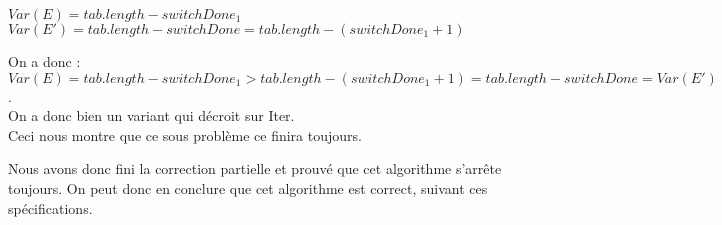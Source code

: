 $Var(E) = tab.length - switchDone_{1}$
$Var(E') = tab.length - switchDone = tab.length - (switchDone_{1}+1)$

On a donc : $Var(E) = tab.length - switchDone_{1} > tab.length - (switchDone_1 +1) = tab.length - switchDone = Var(E')$.\\

On a donc bien un variant qui décroit sur Iter.\\

Ceci nous montre que ce sous problème ce finira toujours. 

Nous avons donc fini la correction partielle et prouvé que cet algorithme s'arrête toujours. On peut donc en conclure que cet algorithme est correct, suivant ces spécifications. \\




